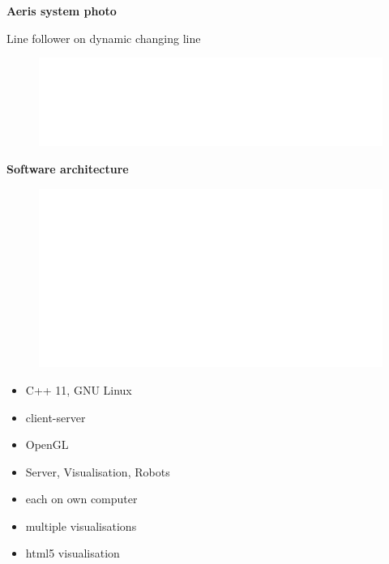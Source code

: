 \documentclass[xcolor=dvipsnames]{beamer}
\begin{document}
\begin{frame}{\bf Aeris system photo}

Line follower on dynamic changing line

\begin{figure}[!htb]
\centering
\includegraphics[scale=.23]{../diagrams/common_lab_inv.png}
\end{figure}

\end{frame}




\begin{frame}{\bf Software architecture}

\begin{figure}[!htb]
\centering
\includegraphics[scale=.3]{../diagrams/aeris_software_block_inv.png}
\end{figure}


\begin{minipage}{.5\textwidth}


\begin{itemize}
  \item C++ 11, GNU Linux
  \item client-server
  \item OpenGL
\end{itemize}

  \end{minipage}%
\begin{minipage}{.5\textwidth}

  \begin{itemize}
    \item Server, Visualisation, Robots
    \item each on own computer
    \item multiple visualisations
    \item html5 visualisation
  \end{itemize}

\end{minipage}


\end{frame}
\end{document}
